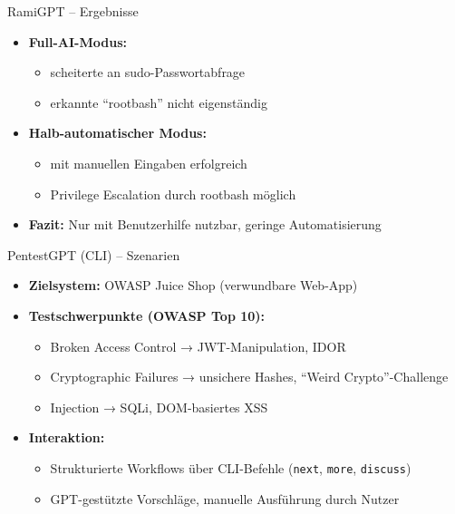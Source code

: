 \documentclass[
	aspectratio=169,	%
	onlytextwidth,		%
	t,					%
	]{beamer}
\begin{document}
\begin{frame}{RamiGPT – Ergebnisse}
	\begin{itemize}
		\item \textbf{Full-AI-Modus:}
		\begin{itemize}
			\item scheiterte an sudo-Passwortabfrage
			\item erkannte \enquote{rootbash} nicht eigenständig
		\end{itemize}
		
		\item \textbf{Halb-automatischer Modus:}
		\begin{itemize}
			\item mit manuellen Eingaben erfolgreich
			\item Privilege Escalation durch rootbash möglich
		\end{itemize}
		
		\item \textbf{Fazit:}  
		Nur mit Benutzerhilfe nutzbar, geringe Automatisierung
	\end{itemize}
\end{frame}


\begin{frame}{PentestGPT (CLI) – Szenarien}
	\begin{itemize}
		\item \textbf{Zielsystem:} OWASP Juice Shop (verwundbare Web-App)
		
		\item \textbf{Testschwerpunkte (OWASP Top 10):}
		\begin{itemize}
			\item Broken Access Control → JWT-Manipulation, IDOR
			\item Cryptographic Failures → unsichere Hashes, \enquote{Weird Crypto}-Challenge
			\item Injection → SQLi, DOM-basiertes XSS
		\end{itemize}
		
		\item \textbf{Interaktion:}
		\begin{itemize}
			\item Strukturierte Workflows über CLI-Befehle (\texttt{next}, \texttt{more}, \texttt{discuss})
			\item GPT-gestützte Vorschläge, manuelle Ausführung durch Nutzer
		\end{itemize}
	\end{itemize}
\end{frame}
\end{document}
